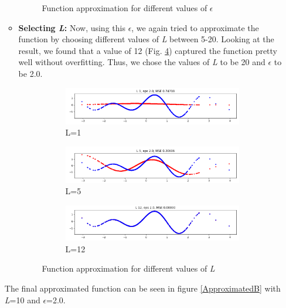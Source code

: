\begin{itemize}
\begin{itemize}
\begin{figure}[H]
\begin{subfigure}{\textwidth}
    \end{subfigure}
    \caption{Function approximation for different values of $\epsilon$}
    \label{task5_1_3eps}
\end{figure}
    \item \textbf{Selecting \textit{L}:}
    Now, using this $\epsilon$, we again tried to approximate the function by choosing different values of \textit{L} between 5-20. Looking at the result, we found that a value of 12 (Fig. \ref{L12}) captured the function pretty well without overfitting. Thus, we chose the values of \textit{L} to be 20 and $\epsilon$ to be 2.0.
    \begin{figure}[H]
    \centering
    \begin{subfigure}{\textwidth}
        \centering
        \includegraphics[width=0.6\linewidth]{images/Lvalues1.png}
        \caption{L=1}
        \label{L1}
    \end{subfigure}
    \begin{subfigure}{\textwidth}
    \centering
        \includegraphics[width=0.6\linewidth]{images/Lvalues5.png}
        \caption{L=5}
        \label{L5}
    \end{subfigure}
    \begin{subfigure}{\textwidth}
    \centering
        \includegraphics[width=0.6\linewidth]{images/Lvalues10.png}
        \caption{L=12}
        \label{L12}
    \end{subfigure}
    \caption{Function approximation for different values of \textit{L}}
    \label{task5_1_3L}
\end{figure}
\end{itemize}

The final approximated function can be seen in figure \ref{ApproximatedB} with \textit{L}=10 and $\epsilon$=2.0.


\end{itemize}
